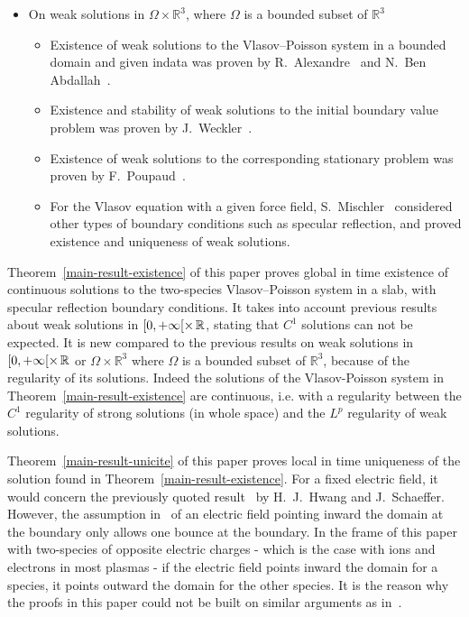 \documentclass[10pt]{amsart}
\theoremstyle{definition}\newtheorem{defi}[theo]{Definition}\newtheorem{rema}[theo]{Remark}\newtheorem{exam}[theo]{Example}\newtheorem{exem}[theo]{Example}\newtheorem{nota}[theo]{Notation}
\newcommand{\R}{\mathbb{R}}
\begin{document}
\begin{itemize}
\begin{itemize}
\end{itemize}
\vspace{4pt}
\item On weak solutions in $\Omega \times \R ^3$, where $\Omega $ is a bounded subset of $\R ^3$
\begin{itemize}
\item[-] Existence of weak solutions to the Vlasov--Poisson system in a bounded domain and given indata was proven by R.~Alexandre~\cite{Ale93} and N.~Ben Abdallah~\cite{Ben94}.
\item[-] Existence and stability of weak solutions to the initial boundary value problem was proven by J.~Weckler~\cite{Wec95}.
\item[-] Existence of weak solutions to the corresponding stationary problem was proven by F.~Poupaud~\cite{Pou90}.
\item[-] For the Vlasov equation with a given force field, S.~Mischler~\cite{Mis99} considered other types of boundary conditions such as specular reflection, and proved existence and uniqueness of weak solutions.
\end{itemize}
\end{itemize}


Theorem~\ref{main-result-existence} of this paper proves global in time existence of continuous solutions to the two-species Vlasov--Poisson system in a slab, with specular reflection boundary conditions. It takes into account previous results~\cite{Guo95} about weak solutions in $[0,+\infty [
\times \hspace*{0.02in}\R $, stating that $C^1$ solutions can not be expected. It is new compared to the previous results on weak solutions in $[0,+\infty [\times \hspace*{0.02in}\R $ or $\Omega \times \R ^3$ where $\Omega $ is a bounded subset of $\R ^3$, because of the regularity of its solutions. Indeed the solutions of the Vlasov-Poisson system in Theorem~\ref{main-result-existence} are continuous, i.e. with a regularity between the $C^1$ regularity of strong solutions (in whole space) and the $L^p$ regularity of weak solutions. 


Theorem~\ref{main-result-unicite} of this paper proves local in time uniqueness of the solution found in Theorem~\ref{main-result-existence}. For a fixed electric field, it would concern the previously quoted result~\cite{HS08} by H.~J.~Hwang and J.~Schaeffer. However, the assumption in~\cite{HS08} of an electric field pointing inward the domain at the boundary only allows one bounce at the boundary. In the frame of this paper with two-species of opposite electric charges - which is the case with ions and electrons in most plasmas - if the electric field points inward the domain for a species, it points outward the domain for the other species. It is the reason why the proofs in this paper could not be built on similar arguments as in~\cite{HS08}.
\end{document}

